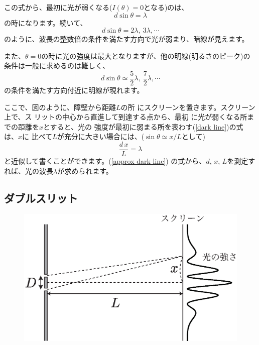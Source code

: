 この式から、最初に光が弱くなる($I(\theta)=0$となる)のは、
\begin{equation}
d\sin\theta=\lambda
\label{dark line}
\end{equation}
の時になります。続いて、 
\[
d\sin\theta=2\lambda,~3\lambda,\cdots
\]
のように、波長の整数倍の条件を満たす方向で光が弱まり、暗線が見えます。

また、$\theta=0$の時に光の強度は最大となりますが、他の明線(明るさのピーク)の
条件は一般に求めるのは難しく、
\[
d\sin\theta \simeq \frac{5}{2}\lambda,~\frac{7}{2}\lambda,\cdots
\]
の条件を満たす方向付近に明線が現れます。

%


ここで、図のように、障壁から距離$L$の所
にスクリーンを置きます。スクリーン上で、ス
リットの中心から直進して到達する点から、最初
に光が弱くなる所までの距離を$x$とすると、光の
強度が最初に弱まる所を表わす(\ref{dark line})の式は、$x$に 
比べて$L$が充分に大きい場合には、($\sin\theta\simeq x/L$として)
\begin{equation}
\frac{d\,x}{L}=\lambda
\label{approx dark line}
\end{equation}
と近似して書くことができます。(\ref{approx dark line})
の式から、$d$, $x$, $L$を測定すれば、光の波長$\lambda$が求められます。


\subsection{ダブルスリット}


\begin{figure}
\includegraphics[scale=0.5]{03_Interference/two-slits.eps}
\end{figure}


